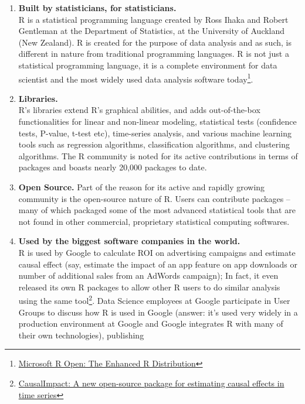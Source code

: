 \documentclass[]{article}
\begin{document}
\begin{enumerate}
\def\labelenumi{\arabic{enumi}.}
\item
  \textbf{Built by statisticians, for statisticians.}\\
  R is a statistical programming language created by Ross Ihaka and
  Robert Gentleman at the Department of Statistics, at the University of
  Auckland (New Zealand). R is created for the purpose of data analysis
  and as such, is different in nature from traditional programming
  languages. R is not just a statistical programming language, it is a
  complete environment for data scientist and the most widely used data
  analysis software today\footnote{\href{http://mran.revolutionanalytics.com/rro/}{Microsoft
    R Open: The Enhanced R Distribution}}.
\item
  \textbf{Libraries.}\\
  R's libraries extend R's graphical abilities, and adds out-of-the-box
  functionalities for linear and non-linear modeling, statistical tests
  (confidence tests, P-value, t-test etc), time-series analysis, and
  various machine learning tools such as regression algorithms,
  classification algorithms, and clustering algorithms. The R community
  is noted for its active contributions in terms of packages and boasts
  nearly 20,000 packages to date.
\item
  \textbf{Open Source.} Part of the reason for its active and rapidly
  growing community is the open-source nature of R. Users can contribute
  packages -- many of which packaged some of the most advanced
  statistical tools that are not found in other commercial, proprietary
  statistical computing softwares.
\item
  \textbf{Used by the biggest software companies in the world.}\\
  R is used by Google to calculate ROI on advertising campaigns and
  estimate causal effect (say, estimate the impact of an app feature on
  app downloads or number of additional sales from an AdWords campaign);
  In fact, it even released its own R packages to allow other R users to
  do similar analysis using the same tool\footnote{\href{https://opensource.googleblog.com/2014/09/causalimpact-new-open-source-package.html}{CausalImpact:
    A new open-source package for estimating causal effects in time
    series}}. Data Science employees at Google participate in User
  Groups to discuss how R is used in Google (answer: it's used very
  widely in a production environment at Google and Google integrates R
  with many of their own technologies), publishing

\end{enumerate}
\end{document}
